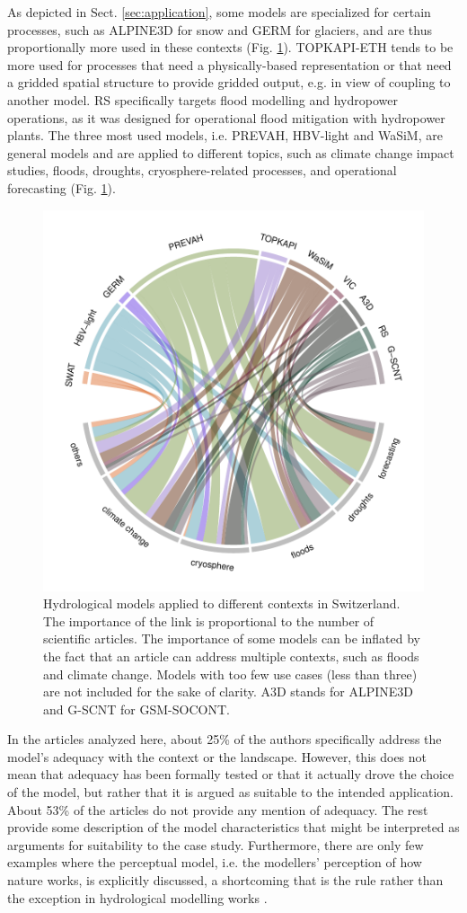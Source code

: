 \documentclass[10pt,a4paper]{article}
\begin{document}
As depicted in Sect. \ref{sec:application}, some models are specialized for certain processes, such as ALPINE3D for snow and GERM for glaciers, and are thus proportionally more used in these contexts (Fig. \ref{fig:applications}). TOPKAPI-ETH tends to be more used for processes that need a physically-based representation or that need a gridded spatial structure to provide gridded output, e.g. in view of coupling to another model. RS specifically targets flood modelling and hydropower operations, as it was designed for operational flood mitigation with hydropower plants. The three most used models, i.e. PREVAH, HBV-light and WaSiM, are general models and are applied to different topics, such as climate change impact studies, floods, droughts, cryosphere-related processes, and operational forecasting (Fig. \ref{fig:applications}).

\begin{figure}[htb]
	\begin{center}
		\includegraphics[width=0.70\columnwidth]{figures/chord_diagram_contexts}
		\caption{{Hydrological models applied to different contexts in Switzerland. The importance of the link is proportional to the number of scientific articles. The importance of some models can be inflated by the fact that an article can address multiple contexts, such as floods and climate change. Models with too few use cases (less than three) are not included for the sake of clarity. A3D stands for ALPINE3D and G-SCNT for GSM-SOCONT. 
		{\label{fig:applications}}
		}}
	\end{center}
\end{figure}

In the articles analyzed here, about 25\% of the authors specifically address the model's adequacy with the context or the landscape. However, this does not mean that adequacy has been formally tested or that it actually drove the choice of the model, but rather that it is argued as suitable to the intended application. About 53\% of the articles do not provide any mention of adequacy. The rest provide some description of the model characteristics that might be interpreted as arguments for suitability to the case study. Furthermore, there are only few examples where the perceptual model, i.e. the modellers' perception of how nature works, is explicitly discussed, a shortcoming that is the rule rather than the exception in hydrological modelling works \citep{Beven2021}.
\end{document}
